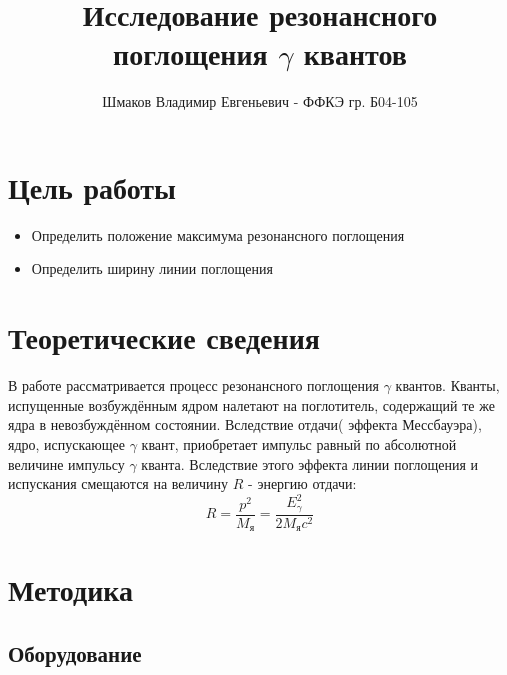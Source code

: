 \documentclass[a4paper, 14pt]{article}
\title{\textcolor{main_title}{Исследование резонансного поглощения $\gamma$ квантов}}
\author{Шмаков Владимир Евгеньевич - ФФКЭ гр. Б04-105}
\begin{document}
\maketitle



\section*{\textcolor{header}{Цель работы}}

\begin{itemize}
    \item Определить положение максимума резонансного поглощения
    \item Определить ширину линии поглощения
\end{itemize}


\section*{\textcolor{header}{Теоретические сведения}}


\begin{minipage}{0.5\textwidth}

    

\end{minipage}
\hfill
\begin{minipage}{0.5\textwidth}
    \raggedright
    В работе рассматривается процесс резонансного поглощения $\gamma$ квантов.
    Кванты, испущенные возбуждённым ядром налетают на поглотитель, содержащий те же
    ядра в невозбуждённом состоянии.
    \newline
    Вследствие отдачи( \textcolor{defenition}{эффекта Мессбауэра}), ядро, испускающее $\gamma$ квант, приобретает
    импульс равный по абсолютной величине импульсу $\gamma$ кванта. Вследствие этого эффекта
    линии поглощения и испускания смещаются на величину $R$ - энергию отдачи:
    \begin{equation}
        R = \frac{p^{2}}{M_{\text{я}}} = \frac{E_{\gamma}^{2}}{2 M_{\text{я}} c^{2}}
    \end{equation}
\end{minipage}




\section*{\textcolor{header}{Методика}}
\subsection*{\textcolor{sub_header}{Оборудование}}
\end{document}
